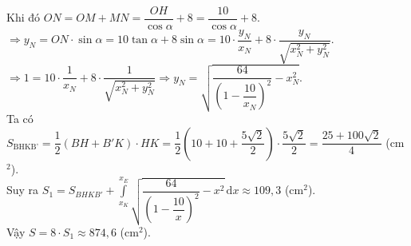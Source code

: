 \begin{bt}
{	  Khi đó
	 $ON=OM+MN=\dfrac{OH}{\cos \alpha}+8=\dfrac{10}{\cos \alpha}+8$.\\
	 $\Rightarrow y_N=ON\cdot \sin \alpha=10 \tan \alpha+8\sin \alpha=10 \cdot \dfrac{y_N}{x_N}+8\cdot \dfrac{y_N}{\sqrt{x_N^2+y_N^2}}$.\\
	 $\Rightarrow 1=10 \cdot \dfrac{1}{x_N}+8\cdot \dfrac{1}{\sqrt{x_N^2+y_N^2}} \Rightarrow y_N=\sqrt{\dfrac{64}{\left(1-\dfrac{10}{x_N}\right)^2}-x_N^2}$.\\
	 Ta có 
	 $S_{\text {BHKB'}}=\dfrac{1}{2}(BH+B'K) \cdot HK=\dfrac{1}{2}\left(10+10+\dfrac{5\sqrt{2}}{2}\right) \cdot \dfrac{5\sqrt{2}}{2}=\dfrac{25+100\sqrt{2}}{4} $ (cm$^2$).\\
	 Suy ra $S_1=S_{BHKB'}+\displaystyle\int\limits_{x_K}^{x_E} \sqrt{\dfrac{64}{\left(1-\dfrac{10}{x}\right)^2}-x^2}\mathrm{\,d}x \approx 109{,}3$ (cm$^2$).\\
	 Vậy $S=8\cdot S_1 \approx 874{,}6$ (cm$^2$).
}
\end{bt}

